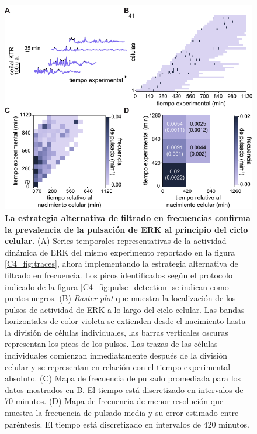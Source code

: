 \documentclass[./main.tex]{subfiles}
\begin{document}
\begin{subappendices}
\begin{figure}
    \centering
    \includegraphics[width=1\columnwidth]{figures/chapter4/C4_band_pass_filter_cell_cycle.pdf}\caption{\textbf{La estrategia alternativa de filtrado en frecuencias confirma la prevalencia de la pulsación de ERK al principio del ciclo celular.} (A) Series temporales representativas de la actividad dinámica de ERK del mismo experimento reportado en la figura \ref{C4_fig:traces}, ahora implementando la estrategia alternativa de filtrado en frecuencia. Los picos identificados según el protocolo indicado de la figura \ref{C4_fig:pulse_detection} se indican como puntos negros. (B) \textit{Raster plot} que muestra la localización de los pulsos de actividad de ERK a lo largo del ciclo celular. Las bandas horizontales de color violeta se extienden desde el nacimiento hasta la división de células individuales, las barras verticales oscuras representan los picos de los pulsos. Las trazas de las células individuales comienzan inmediatamente después de la división celular y se representan en relación con el tiempo experimental absoluto. (C) Mapa de frecuencia de pulsado promediada para los datos mostrados en B. El tiempo está discretizado en intervalos de 70 minutos. (D) Mapa de frecuencia de menor resolución que muestra la frecuencia de pulsado media y su error estimado entre paréntesis. El tiempo está discretizado en intervalos de 420 minutos.}
    \label{C4_fig:band_pass_filter_cell_cycle}
\end{figure}




\end{subappendices}
\end{document}
